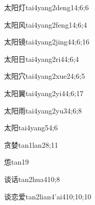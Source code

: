 \begin{verbete}{太阳灯}{tai4yang2deng1}{4;6;6}
\end{verbete}

\begin{verbete}{太阳风}{tai4yang2feng1}{4;6;4}
\end{verbete}

\begin{verbete}{太阳镜}{tai4yang2jing4}{4;6;16}
\end{verbete}

\begin{verbete}{太阳日}{tai4yang2ri4}{4;6;4}
\end{verbete}

\begin{verbete}{太阳穴}{tai4yang2xue2}{4;6;5}
\end{verbete}

\begin{verbete}{太阳翼}{tai4yang2yi4}{4;6;17}
\end{verbete}

\begin{verbete}{太阳雨}{tai4yang2yu3}{4;6;8}
\end{verbete}

\begin{verbete}{太阳}{tai4yang5}{4;6}
\end{verbete}

\begin{verbete}{贪婪}{tan1lan2}{8;11}
\end{verbete}

\begin{verbete}{怹}{tan1}{9}
\end{verbete}

\begin{verbete}{谈话}{tan2hua4}{10;8}
\end{verbete}

\begin{verbete}{谈恋爱}{tan2lian4'ai4}{10;10;10}
\end{verbete}


